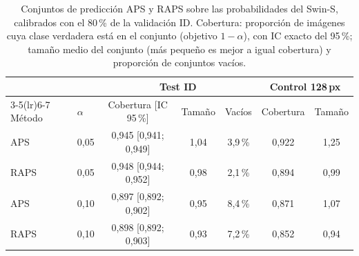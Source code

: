 \begin{table}[tbp]
\centering
\footnotesize
\setlength{\tabcolsep}{3pt}
\caption{Conjuntos de predicción APS y RAPS sobre las probabilidades del Swin-S, calibrados con el 80\,\% de la validación ID. Cobertura: proporción de imágenes cuya clase verdadera está en el conjunto (objetivo $1-\alpha$), con IC exacto del 95\,\%; tamaño medio del conjunto (más pequeño es mejor a igual cobertura) y proporción de conjuntos vacíos.}
\label{tab:conforme-aps}
\begin{tabular}{llccccc}
\toprule
& & \multicolumn{3}{c}{Test ID} & \multicolumn{2}{c}{Control 128\,px} \\
\cmidrule(lr){3-5}\cmidrule(lr){6-7}
Método & $\alpha$ & Cobertura [IC 95\,\%] & Tamaño & Vacíos & Cobertura & Tamaño \\
\midrule
APS & 0{,}05 & 0{,}945 [0{,}941; 0{,}949] & 1{,}04 & 3{,}9\,\% & 0{,}922 & 1{,}25 \\
RAPS & 0{,}05 & 0{,}948 [0{,}944; 0{,}952] & 0{,}98 & 2{,}1\,\% & 0{,}894 & 0{,}99 \\
APS & 0{,}10 & 0{,}897 [0{,}892; 0{,}902] & 0{,}95 & 8{,}4\,\% & 0{,}871 & 1{,}07 \\
RAPS & 0{,}10 & 0{,}898 [0{,}892; 0{,}903] & 0{,}93 & 7{,}2\,\% & 0{,}852 & 0{,}94 \\
\bottomrule
\end{tabular}
\end{table}
